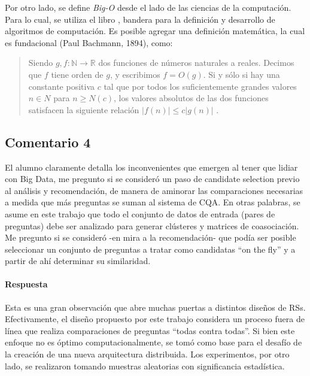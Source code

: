 \bigskip

Por otro lado, se define \textit{Big-O} desde el lado de las ciencias de la computación. Para lo cual, se utiliza el libro \citep{cormen2009introduction}, bandera para la definición y desarrollo de algoritmos de computación. Es posible agregar una definición matemática, la cual es fundacional (Paul Bachmann, 1894), como:

\begin{quotation}
	Siendo \(g,f: \mathbb{N} \rightarrow \mathbb{R}\)  dos funciones de números naturales a reales. Decimos que \(f\) tiene orden de \(g\), y escribimos \(f=O(g)\). Si y sólo si hay una constante positiva \(c\) tal que por todos los suficientemente grandes valores \(n \in N\) para \(n \geq N(c)\), los valores absolutos de las dos funciones satisfacen la siguiente relación \(\left | f(n) \right | \leq c\left | g(n) \right |\) \citep{erk2008theoretische}.
\end{quotation}

\subsection*{Comentario 4}
El alumno claramente detalla los inconvenientes que emergen al tener que lidiar con Big Data, me pregunto si se consideró un paso de candidate selection previo al análisis y recomendación, de manera de aminorar las comparaciones necesarias a medida que más preguntas se suman al sistema de CQA. En otras palabras, se asume en este trabajo que todo el conjunto de datos de entrada (pares de preguntas) debe ser analizado para generar clústeres y matrices de coasociación. Me pregunto si se consideró -en mira a la recomendación- que podía ser posible seleccionar un conjunto de preguntas a tratar como candidatas ``on the fly'' y a partir de ahí determinar su similaridad.

\paragraph*{Respuesta}
Esta es una gran observación que abre muchas puertas a distintos diseños de RSs. Efectivamente, el diseño propuesto por este trabajo considera un proceso fuera de línea que realiza comparaciones de preguntas ``todas contra todas''. Si bien este enfoque no es óptimo computacionalmente, se tomó como base para el desafío de la creación de una nueva arquitectura distribuida. Los experimentos, por otro lado, se realizaron tomando muestras aleatorias con significancia estadística.

